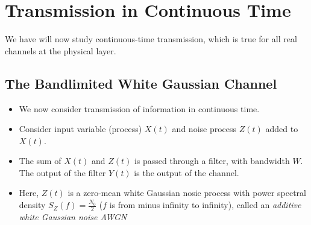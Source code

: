 \documentclass[../main.tex]{subfiles}
\begin{document}
\chapter{Transmission in Continuous Time}
We have will now study continuous-time transmission, which is true for all real channels at the physical layer.
\section{The Bandlimited White Gaussian Channel}
\begin{itemize}
    \item We now consider transmission of information in continuous time.
    \item Consider input variable (process) $X(t)$ and noise process $Z(t)$ added to $X(t)$. 
    \item The sum of $X(t)$ and $Z(t)$ is passed through a filter, with bandwidth $W$. The output of the filter $Y(t)$ is the output of the channel.
    \item Here, $Z(t)$ is a zero-mean white Gaussian nosie process with power spectral density $S_Z(f)=\frac{N_0}{2}$ ($f$ is from minus infinity to infinity), called an \textit{additive white Gaussian noise AWGN}
\end{itemize}
\end{document}
